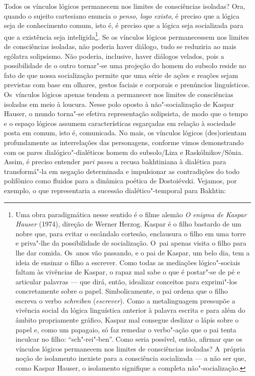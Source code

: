 Todos os vínculos lógicos permanecem nos limites de consciências
isoladas? Ora, quando o sujeito cartesiano enuncia o \emph{penso, logo
existo}, é preciso que a lógica seja de conhecimento comum, isto é, é
preciso que a lógica seja socializada para que a existência seja
inteligida\footnote{Uma obra paradigmática nesse sentido é o filme
  alemão \emph{O enigma de Kaspar Hauser} (1974), direção de Werner
  Herzog. Kaspar é o filho bastardo de um nobre que, para evitar o
  escândalo cortesão, enclausura o filho em uma torre e priva"-lhe da
  possibilidade de socialização. O~pai apenas visita o filho para lhe
  dar comida. Os~anos vão passando, e o pai de Kaspar, um belo dia, tem
  a ideia de ensinar o filho a escrever. Como todas as mediações
  lógico"-sociais faltam às vivências de Kaspar, o rapaz mal sabe o que é
  postar"-se de pé e articular palavras --- que dirá, então, idealizar
  conceitos para exprimi"-los concretamente sobre o papel.
  Simbolicamente, o pai ordena que o filho escreva o verbo
  \emph{schreiben} (\emph{escrever})\emph{.} Como a metalinguagem
  pressupõe a vivência social da lógica linguística anterior à palavra
  escrita e para além do âmbito propriamente gráfico, Kaspar mal
  consegue deslizar o lápis sobre o papel e, como um papagaio, só faz
  remedar o verbo"-ação que o pai tenta inculcar no filho:
  ``sch"-rei"-ben''. Como seria possível, então, afirmar que os vínculos
  lógicos permanecem nos limites de consciências isoladas? A~própria
  noção de isolamento inexiste para a consciência socializada --- a não
  ser que, como Kaspar Hauser, o isolamento signifique a completa
  não"-socialização.}. Se os vínculos lógicos permanecessem nos limites
de consciências isoladas, não poderia haver diálogo, tudo se reduziria
ao mais ególatra solipsismo. Não poderia, inclusive, haver diálogos
velados, pois a possibilidade de o outro tornar"-se uma projeção do homem
do subsolo reside no fato de que nossa socialização permite que uma
série de ações e reações sejam previstas com base em olhares, gestos
faciais e corporais e prenúncios linguísticos. Os~vínculos lógicos
apenas tendem a permanecer nos limites de consciências isoladas em meio
à loucura. Nesse polo oposto à não"-socialização de Kaspar Hauser, o
mundo torna"-se efetiva representação solipsista, de modo que o tempo e o
espaço lógicos assumem características esgarçadas em relação à sociedade
posta em comum, isto é, comunicada. No mais, os vínculos lógicos
(des)orientam profundamente as interrelações das personagens, conforme
vimos demonstrando com os pares dialógico"-dialéticos homem do
subsolo/Liza e Raskólnikov/Sônia. Assim, é preciso entender \emph{pari
passu} a recusa bakhtiniana à dialética para transformá"-la em negação
determinada e impulsionar as contradições do todo polifônico como
fluidos para a dinâmica poética de Dostoiévski. Vejamos, por exemplo, o
que representaria a sucessão dialético"-temporal para Bakhtin:


